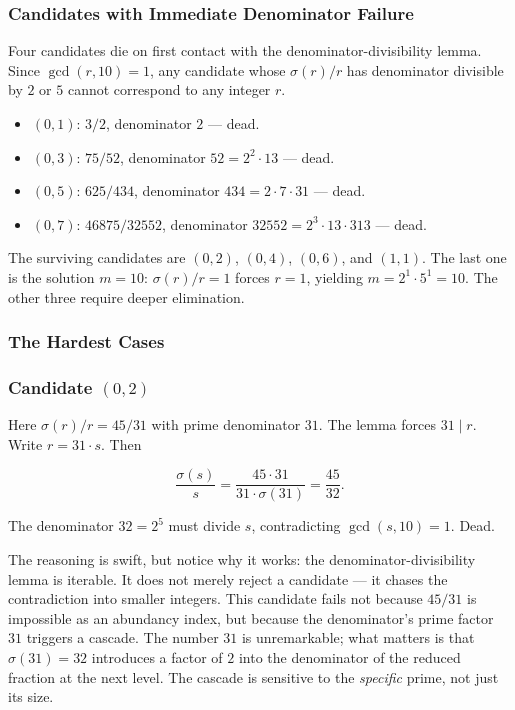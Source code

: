 \documentclass[12pt,a4paper]{article}
\begin{document}
    \subsubsection{Candidates with Immediate Denominator Failure}

    Four candidates die on first contact with the denominator-divisibility lemma. Since $\gcd(r,10) = 1$, any candidate whose $\sigma(r)/r$ has denominator divisible by $2$ or $5$ cannot correspond to any integer $r$.

    \begin{itemize}
        \item $(0,1)$: $3/2$, denominator $2$ --- dead.
        \item $(0,3)$: $75/52$, denominator $52 = 2^2 \cdot 13$ --- dead.
        \item $(0,5)$: $625/434$, denominator $434 = 2 \cdot 7 \cdot 31$ --- dead.
        \item $(0,7)$: $46875/32552$, denominator $32552 = 2^3 \cdot 13 \cdot 313$ --- dead.
    \end{itemize}

    The surviving candidates are $(0,2)$, $(0,4)$, $(0,6)$, and $(1,1)$. The last one is the solution $m = 10$: $\sigma(r)/r = 1$ forces $r = 1$, yielding $m = 2^1 \cdot 5^1 = 10$. The other three require deeper elimination.

    \subsubsection{The Hardest Cases}

    \subsubsection{Candidate $(0,2)$}

    Here $\sigma(r)/r = 45/31$ with prime denominator $31$. The lemma forces $31 \mid r$. Write $r = 31 \cdot s$. Then

    \[\frac{\sigma(s)}{s} = \frac{45 \cdot 31}{31 \cdot \sigma(31)} = \frac{45}{32}.\]

    The denominator $32 = 2^5$ must divide $s$, contradicting $\gcd(s,10) = 1$. Dead.

    The reasoning is swift, but notice why it works: the denominator-divisibility lemma is iterable. It does not merely reject a candidate --- it chases the contradiction into smaller integers. This candidate fails not because $45/31$ is impossible as an abundancy index, but because the denominator's prime factor $31$ triggers a cascade. The number $31$ is unremarkable; what matters is that $\sigma(31) = 32$ introduces a factor of $2$ into the denominator of the reduced fraction at the next level. The cascade is sensitive to the \emph{specific} prime, not just its size.
\end{document}
